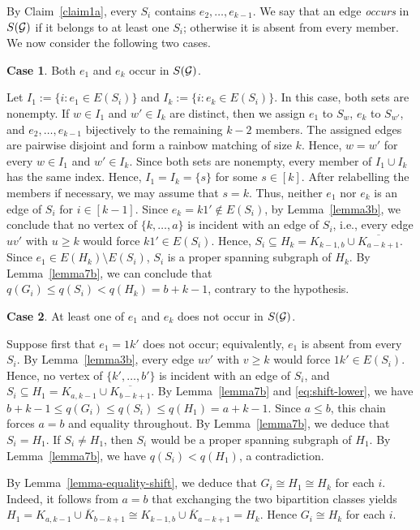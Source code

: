 \documentclass[11pt,a4paper]{article}
\theoremstyle{definition}
\newtheorem{case}{Case}
\numberwithin{equation}{section}
\begin{document}
By Claim~\ref{claim1a}, every $S_i$ contains $e_2,\ldots,e_{k-1}$. We say that an edge \emph{occurs} in $S({\cal G})$ if it belongs to at least one $S_i$; otherwise it is absent from every member. We now consider the following two cases.

\begin{case}
Both $e_1$ and $e_k$ occur in $S({\cal G})$.
\end{case}

Let $I_1:=\{i:e_1\in E(S_i)\}$ and $I_k:=\{i:e_k\in E(S_i)\}$. In this case, both sets are nonempty. If $w\in I_1$ and $w'\in I_k$ are distinct, then we assign $e_1$ to $S_w$, $e_k$ to $S_{w'}$, and $e_2,\ldots,e_{k-1}$ bijectively to the remaining $k-2$ members. The assigned edges are pairwise disjoint and form a rainbow matching of size $k$. Hence, $w=w'$ for every $w\in I_1$ and $w'\in I_k$. Since both sets are nonempty, every member of $I_1\cup I_k$ has the
same index. Hence, $I_1=I_k=\{s\}$ for some $s\in[k]$. After relabelling the members if necessary, we may assume that $s=k$. Thus, neither $e_1$ nor $e_k$ is an edge of $S_i$ for $i\in[k-1]$. Since $e_k=k1'\notin E(S_i)$, by Lemma~\ref{lemma3b}, we conclude that no vertex of $\{k,\ldots,a\}$ is incident with an edge of $S_i$, i.e., every edge $uv'$ with $u\ge k$ would force $k1'\in E(S_i)$. Hence, $S_i\subseteq H_k=K_{k-1,b}\cup\overline{K_{a-k+1}}$.
Since $e_1\in E(H_k)\setminus E(S_i)$, $S_i$ is a proper spanning subgraph of $H_k$. By Lemma~\ref{lemma7b}, we can conclude that $q(G_i)\le q(S_i)<q(H_k)=b+k-1$, contrary to the hypothesis.

\begin{case}
\label{case2b}
At least one of $e_1$ and $e_k$ does not occur in $S({\cal G})$.
\end{case}

Suppose first that $e_1=1k'$ does not occur; equivalently, $e_1$ is absent from every $S_i$. By Lemma~\ref{lemma3b}, every edge $uv'$ with $v\ge k$ would force $1k'\in E(S_i)$. Hence, no vertex of $\{k',\ldots,b'\}$ is incident with an edge of $S_i$, and $S_i\subseteq H_1=K_{a,k-1}\cup\overline{K_{b-k+1}}$. By Lemma~\ref{lemma7b} and \eqref{eq:shift-lower}, we have $b+k-1\le q(G_i)\le q(S_i)\le q(H_1)=a+k-1$. Since $a\le b$, this chain forces $a=b$ and equality throughout. By Lemma~\ref{lemma7b}, we deduce that $S_i=H_1$. If $S_i\neq H_1$, then $S_i$ would be a proper spanning subgraph of
$H_1$. By Lemma~\ref{lemma7b}, we have $q(S_i)<q(H_1)$, a contradiction.

By Lemma~\ref{lemma-equality-shift}, we deduce that $G_i\cong H_1\cong H_k$ for each $i$. Indeed, it follows from \(a=b\) that exchanging the two bipartition classes yields $H_1=K_{a,k-1}\cup\overline{K}_{b-k+1}\cong K_{k-1,b}\cup\overline{K}_{a-k+1}=H_k$. Hence \(G_i\cong H_k\) for each \(i\).
\end{document}
